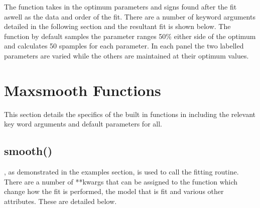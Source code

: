 \documentclass[letterpaper,10pt,english]{sphinxmanual}
\begin{document}
The function takes in the optimum parameters and signs found after the fit
aswell as the data and order of the fit. There are a number of keyword arguments
detailed in the following section and the resultant fit is shown below. The
function by default samples the parameter ranges 50\% either side of the optimum
and calculates 50 spamples for each parameter. In each panel the two
labelled parameters are varied while the others are maintained at their optimum
values.

\noindent{}


\chapter{Maxsmooth Functions}
\label{\detokenize{source/maxsmooth:maxsmooth-functions}}
This section details the specifics of the built in functions in  including
the relevant key word arguments and default parameters for all.


\section{smooth()}
\label{\detokenize{source/maxsmooth:module-maxsmooth.DCF}}\label{\detokenize{source/maxsmooth:smooth}}
, as demonstrated in the examples section,
is used to call the fitting routine. There are a number
of **kwargs that can be assigned to the function which change how the fit is
performed, the model that is fit and various other attributes. These are
detailed below.
\end{document}
